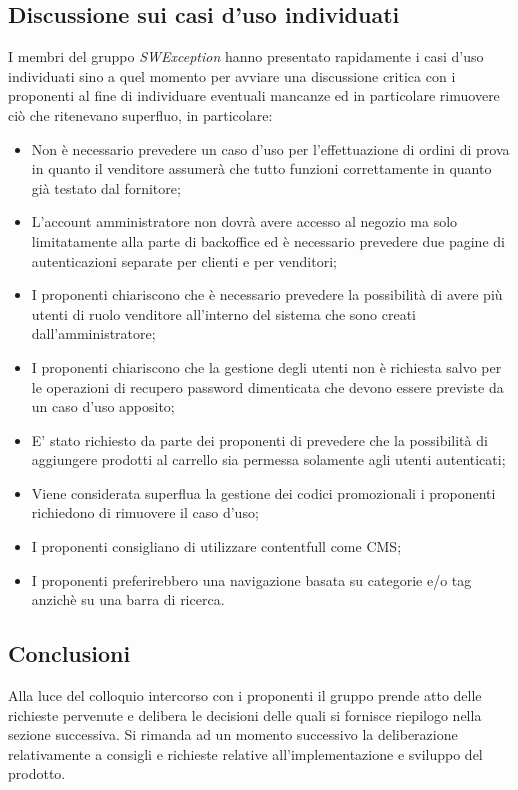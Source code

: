 \subsection{Discussione sui casi d'uso individuati}
I membri del gruppo \textit{SWException} hanno presentato rapidamente i casi d'uso individuati sino a quel momento per avviare una discussione critica con i proponenti al fine di individuare eventuali mancanze ed in particolare rimuovere ciò che ritenevano superfluo,  in particolare:
\begin{itemize}

\item Non è necessario prevedere un caso d'uso per l'effettuazione di ordini di prova in quanto il venditore assumerà che tutto funzioni correttamente in quanto già testato dal fornitore;
\item L'account amministratore non dovrà avere accesso al negozio ma solo limitatamente alla parte di backoffice ed è necessario prevedere due pagine di autenticazioni separate per clienti e per venditori;
\item I proponenti chiariscono che è necessario prevedere la possibilità di avere più utenti di ruolo venditore all'interno del sistema che sono creati dall'amministratore; 
\item I proponenti chiariscono che la gestione degli utenti non è richiesta salvo per le operazioni di recupero password dimenticata che devono essere previste da un caso d'uso apposito;
\item E' stato richiesto da parte dei proponenti di prevedere che la possibilità di aggiungere prodotti al carrello sia permessa solamente agli utenti autenticati;
\item Viene considerata superflua la gestione dei codici promozionali i proponenti richiedono di rimuovere il caso d'uso;
\item I proponenti consigliano di utilizzare contentfull come CMS;
\item I proponenti preferirebbero una navigazione basata su categorie e/o tag anzichè su una barra di ricerca.

\end{itemize}

\subsection{Conclusioni}
Alla luce del colloquio intercorso con i proponenti il gruppo prende atto delle richieste pervenute e delibera le decisioni delle quali si fornisce riepilogo nella sezione successiva.  Si rimanda ad un momento successivo la deliberazione relativamente a consigli e richieste relative all'implementazione e sviluppo del prodotto.
